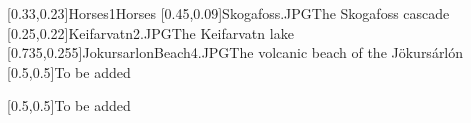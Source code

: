 



\graphicspath{{Figures/}{Figures/Iceland/}}


\subtitle{Day 3}
\date{28.10.2019}


    
    [0.33,0.23]{Horses1}{Horses}
    [0.45,0.09]{Skogafoss.JPG}{The Skogafoss cascade}
    [0.25,0.22]{Keifarvatn2.JPG}{The Keifarvatn lake}
    [0.735,0.255]{JokursarlonBeach4.JPG}{The volcanic beach of the J\"okurs\'arl\'on}
    [0.5,0.5]{}{To be added}
    
    [0.5,0.5]{}{To be added}

